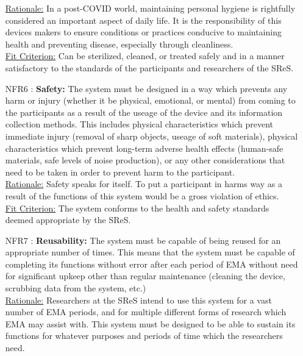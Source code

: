\documentclass[12pt]{article}
\begin{document}
\begin{itemize}
\underline{Rationale:} In a post-COVID world, maintaining personal hygiene is rightfully considered an important aspect of daily life. It is the responsibility of this devices makers to ensure conditions or practices conducive to maintaining health and preventing disease, especially through cleanliness.\\

\underline{Fit Criterion:} Can be sterilized, cleaned, or treated safely and in a manner satisfactory to the standards of the participants and researchers of the SReS.\\


\item[NFR6 \label{NFR6}:]
  \textbf{Safety:} The system must be designed in a way which prevents any harm or injury (whether it be physical, emotional, or mental) from coming to the participants as a result of the useage of the device and its information collection methods. This includes physical characteristics which prevent immediate injury (removal of sharp objects, useage of soft materials), physical characteristics which prevent long-term adverse health effects (human-safe materials, safe levels of noise production), or any other considerations that need to be taken in order to prevent harm to the participant.\\


\underline{Rationale:} Safety speaks for itself. To put a participant in harms way as a result of the functions of this system would be a gross violation of ethics.\\

\underline{Fit Criterion:} The system conforms to the health and safety standards deemed appropriate by the SReS.\\

\item[NFR7 \label{NFR7}:]
  \textbf{Reusability:} The system must be capable of being reused for an appropriate number of times. This means that the system must be capable of completing its functions without error after each period of EMA without need for significant upkeep other than regular maintenance (cleaning the device, scrubbing data from the system, etc.)\\

\underline{Rationale:} Researchers at the SReS intend to use this system for a vast number of EMA periods, and for multiple different forms of research which EMA may assist with. This system must be designed to be able to sustain its functions for whatever purposes and periods of time which the researchers need.\\


\end{itemize}
\end{document}
